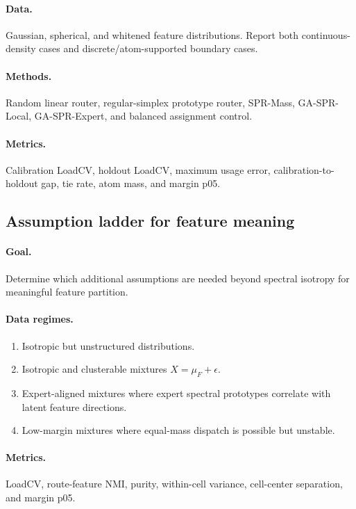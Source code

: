 \documentclass{article}
\begin{document}
\paragraph{Data.} Gaussian, spherical, and whitened feature distributions.
Report both continuous-density cases and discrete/atom-supported boundary cases.

\paragraph{Methods.} Random linear router, regular-simplex prototype router,
SPR-Mass, GA-SPR-Local, GA-SPR-Expert, and balanced assignment control.

\paragraph{Metrics.} Calibration LoadCV, holdout LoadCV, maximum usage error,
calibration-to-holdout gap, tie rate, atom mass, and margin p05.

\subsection{Assumption ladder for feature meaning}

\paragraph{Goal.} Determine which additional assumptions are needed beyond
spectral isotropy for meaningful feature partition.

\paragraph{Data regimes.}
\begin{enumerate}
\item Isotropic but unstructured distributions.
\item Isotropic and clusterable mixtures $X=\mu_F+\epsilon$.
\item Expert-aligned mixtures where expert spectral prototypes correlate with
latent feature directions.
\item Low-margin mixtures where equal-mass dispatch is possible but unstable.
\end{enumerate}

\paragraph{Metrics.} LoadCV, route-feature NMI, purity, within-cell variance,
cell-center separation, and margin p05.
\end{document}
